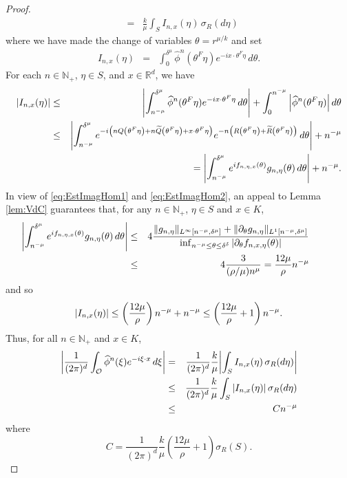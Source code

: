 \documentclass[11pt, letter]{book}
\newcommand{\f}[2]{\frac{#1}{#2}}
\begin{document}
\begin{proof}
\begin{eqnarray*}
    &=&
    \frac{k}{\mu}\int_S I_{n,x}(\eta)\,\sigma_R(d\eta)
\end{eqnarray*}
where we have made the change of variables $\theta=r^{\mu/ k}$ and set
\begin{eqnarray*}
    I_{n,x}(\eta)&=&\int_0^{\delta^{\mu}}\widehat{\phi}^n(\theta^F\eta)e^{-ix\cdot\theta^F\eta}\,d\theta.
\end{eqnarray*}
For each $n\in\mathbb{N}_+$, $\eta\in S$, and $x\in\mathbb{R}^d$, we have
\begin{eqnarray*}
\abs{I_{n,x}(\eta)}
&\leq & 
\abs{\int_{n^{-\mu}}^{\delta^{\mu}}\widehat{\phi}^n(\theta^F\eta)e^{-ix\cdot\theta^F\eta}\,d\theta} +\int_{0}^{n^{-\mu}}\abs{\widehat{\phi}^n(\theta^F\eta)}\,d\theta\\
&\leq& \abs{\int_{n^{-\mu}}^{\delta^\mu} e^{-i\left(nQ\left(\theta^F\eta\right)+n\widetilde{Q}\left(\theta^F\eta\right)+x\cdot\theta^F\eta\right)}e^{-n\left(R\left(\theta^F\eta\right)+\widetilde{R}\left(\theta^F\eta\right)\right)}\,d\theta}+n^{-\mu}\\
& &\hspace{1cm}=\abs{\int_{n^{-\mu}}^{\delta^\mu} e^{i f_{n,\eta,x}(\theta) } g_{n,\eta}(\theta)\,d\theta} 
+ n^{-\mu}.
\end{eqnarray*}
In view of \eqref{eq:EstImagHom1} and \eqref{eq:EstImagHom2}, an appeal to Lemma \ref{lem:VdC} guarantees that, for any $n\in\mathbb{N}_+$, $\eta\in S$ and $x\in K$,
\begin{eqnarray*}
 \hspace{-1cm}\abs{\int_{n^{-\mu}}^{\delta^\mu}e^{if_{n,\eta,x}(\theta)}g_{n,\eta}(\theta)\,d\theta}
    &\leq& 
    4
    \frac{ 
    \|g_{n,\eta}\|_{L^\infty[n^{-\mu},\delta^{\mu}]}
    +
    \|\partial_{\theta}g_{n,\eta}\|_{L^1[n^{-\mu},\delta^{\mu}]}
    }{
    \inf_{n^{-\mu}\leq\theta\leq \delta^{\delta}}|\partial_{\theta}f_{n,x,\eta}(\theta)|
    }\\
    &\leq& 4\frac{3}{(\rho/\mu) n^{\mu}}=\frac{12\mu}{\rho}n^{-\mu}
\end{eqnarray*}
and so
\begin{equation*}
    \abs{I_{n,x}(\eta)}\leq \left(\frac{12\mu}{\rho}\right)n^{-\mu}+n^{-\mu}\leq \left(\frac{12\mu}{\rho}+1\right)n^{-\mu}.
\end{equation*}
Thus, for all $n\in\mathbb{N}_+$ and $x\in K$,
\begin{eqnarray*}
\abs{\f{1}{(2\pi)^d}\int_{\mathcal{O}}\widehat{\phi}^n(\xi)e^{-i\xi\cdot x}\,d\xi}
&=&\frac{1}{(2\pi)^d}\f{k}{\mu}\abs{\int_S I_{n,x}(\eta)\,\sigma_R(d\eta)} \\
&\leq& \frac{1}{(2\pi)^d}\f{k}{\mu}\int_S \abs{I_{n,x}(\eta)}\,\sigma_R(d\eta)\\
&\leq& Cn^{-\mu}
\end{eqnarray*}
where
\begin{equation*}
    C=\f{1}{(2\pi)^d} \f{k}{\mu} \left(\frac{12\mu}{\rho}+1\right)\sigma_R(S).
\end{equation*}
\end{proof}
\end{document}
